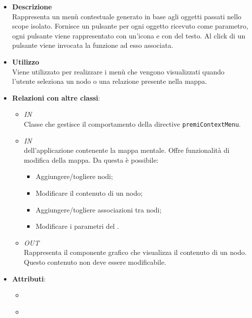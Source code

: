 \begin{itemize}
\item \textbf{Descrizione}\\
Rappresenta un menù contestuale generato in base agli oggetti passati nello scope isolato. Fornisce un pulsante per ogni oggetto ricevuto come parametro, ogni pulsante viene rappresentato con un'icona e con del testo. Al click di un pulsante viene invocata la funzione ad esso associata.
\item \textbf{Utilizzo}\\
Viene utilizzato per realizzare i menù che vengono visualizzati quando l'utente seleziona un nodo o una relazione presente nella mappa.
\item \textbf{Relazioni con altre classi}:
\begin{itemize}
\item \textit{IN} \hyperref[\nogloxy{Premi::Front-End::Controllers::ContextMenuController}]{}\\
Classe che gestisce il comportamento della directive \texttt{premiContextMenu}.
\item \textit{IN} \hyperref[\nogloxy{Premi::Front-End::Views::MindmapEditorView}]{}\\
 dell’applicazione contenente la mappa mentale. Offre funzionalità di modifica della mappa.
Da questa  è possibile:
\begin{itemize}
\item Aggiungere/togliere nodi;
\item Modificare il contenuto di un nodo;
\item Aggiungere/togliere associazioni tra nodi;
\item Modificare i parametri del .
\end{itemize}
\item \textit{OUT} \hyperref[\nogloxy{Premi::Front-End::Directives::premiNode}]{}\\
Rappresenta il componente grafico che visualizza il contenuto di un nodo. Questo contenuto non deve essere modificabile.
\end{itemize}
\item \textbf{Attributi}:
\begin{itemize}
\item {}
\\ \dpDirectiveController
\item {}

\end{itemize}
\end{itemize}
